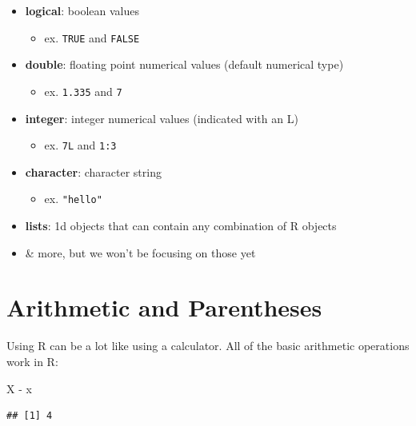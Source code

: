 \documentclass[
]{book}
\newenvironment{Shaded}{\begin{snugshade}}{\end{snugshade}}
\newcommand{\NormalTok}[1]{#1}
\newcommand{\SpecialCharTok}[1]{\textcolor[rgb]{0.00,0.00,0.00}{#1}}
\providecommand{\tightlist}{%
  \setlength{\itemsep}{0pt}\setlength{\parskip}{0pt}}
\begin{document}
\begin{itemize}
\tightlist
\item
  \textbf{logical}: boolean values

  \begin{itemize}
  \tightlist
  \item
    ex. \texttt{TRUE} and \texttt{FALSE}
  \end{itemize}
\item
  \textbf{double}: floating point numerical values (default numerical type)

  \begin{itemize}
  \tightlist
  \item
    ex. \texttt{1.335} and \texttt{7}
  \end{itemize}
\item
  \textbf{integer}: integer numerical values (indicated with an L)

  \begin{itemize}
  \tightlist
  \item
    ex. \texttt{7L} and \texttt{1:3}
  \end{itemize}
\item
  \textbf{character}: character string

  \begin{itemize}
  \tightlist
  \item
    ex. \texttt{"hello"}\\
  \end{itemize}
\item
  \textbf{lists}: 1d objects that can contain any combination of R objects
\item
  \& more, but we won't be focusing on those yet
\end{itemize}

\hypertarget{arithmetic-and-parentheses}{%
\section{Arithmetic and Parentheses}\label{arithmetic-and-parentheses}}

Using R can be a lot like using a calculator. All of the basic arithmetic operations work in R:

\begin{Shaded}
\begin{Highlighting}[]
\NormalTok{X }\SpecialCharTok{{-}}\NormalTok{ x}
\end{Highlighting}
\end{Shaded}

\begin{verbatim}
## [1] 4
\end{verbatim}
\end{document}
